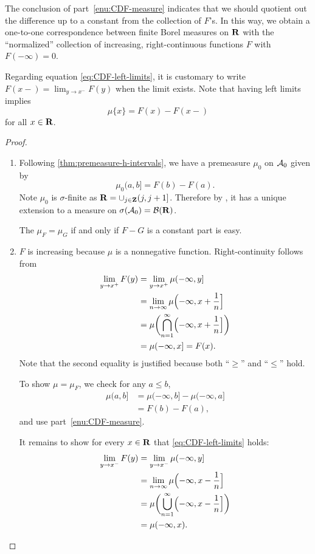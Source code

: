 The conclusion of part~\ref{enu:CDF-measure} indicates that we should quotient out the difference up to a constant from the collection of $F$'s. In this way, we obtain a one-to-one correspondence between finite Borel measures on $\mathbf{R}$ with the ``normalized'' collection of increasing, right-continuous functions $F$ with $F(-\infty) = 0$.

Regarding equation \eqref{eq:CDF-left-limits}, it is customary to write $F(x-) = \lim_{y \to x^-} F(y)$ when the limit exists. Note that having left limits implies \[\mu\{x\} = F(x) - F(x-)\] for all $x \in \mathbf{R}$.

\begin{proof} \leavevmode
    \begin{enumerate}
        \item Following \cref{thm:premeasure-h-intervals}, we have a premeasure $\mu_0$ on $\mathcal{A}_0$ given by \[
          \mu_0(a,b] = F(b) - F(a).
        \] Note $\mu_0$ is $\sigma$-finite as $\mathbf{R} = \cup_{j\in \mathbf{Z}} (j,j+1]$. Therefore by , it has a unique extension to a measure on $\sigma(\mathcal{A}_0) = \mathcal{B}(\mathbf{R})$.
        
        The $\mu_F = \mu_G$ if and only if $F - G$ is a constant part is easy.
        \item $F$ is increasing because $\mu$ is a nonnegative function. Right-continuity follows from \begin{align*}
            \lim_{y \to x^+} F(y) & = \lim_{y \to x^+} \mu(-\infty,y] \\ & = \lim_{n\to \infty} \mu\Bigl(-\infty,x+\frac{1}{n}\Bigr]\\& = \mu\biggl(\bigcap_{n=1}^\infty \Bigl(-\infty,x+\frac{1}{n}\Bigr]\biggr) \\
            & = \mu(-\infty,x] = F(x).
        \end{align*} Note that the second equality is justified because both ``$\geq$'' and ``$\leq$'' hold.

        To show $\mu = \mu_F$, we check for any $a \leq b$, \begin{align*}
            \mu(a,b] & = \mu(-\infty,b] - \mu(-\infty,a] \\
                & = F(b) - F(a),
        \end{align*} and use part~\ref{enu:CDF-measure}.

        It remains to show for every $x \in \mathbf{R}$ that \eqref{eq:CDF-left-limits} holds: \begin{align*}
            \lim_{y \to x^-} F(y) & = \lim_{y \to x^-} \mu(-\infty,y] \\ 
            & = \lim_{n \to \infty} \mu\Bigl(-\infty,x-\frac{1}{n}\Bigr] \\
            & = \mu\biggl(\bigcup_{n=1}^\infty\Bigl(-\infty, x -\frac{1}{n}\Bigr]\biggr) \\
            & = \mu(-\infty,x). \qedhere
        \end{align*}
    \end{enumerate}
\end{proof}

